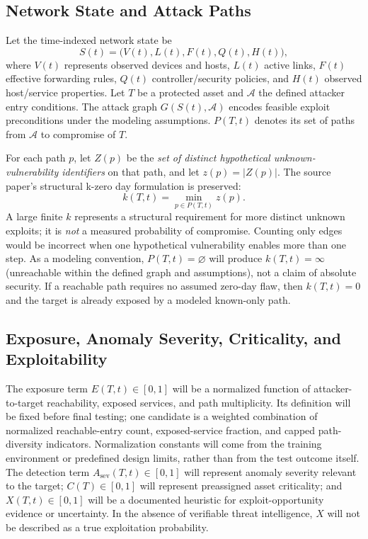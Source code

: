 \documentclass[12pt,a4paper,oneside]{article}
\begin{document}
\subsection{Network State and Attack Paths}
Let the time-indexed network state be
\begin{equation}
S(t)=\bigl(V(t),L(t),F(t),Q(t),H(t)\bigr),\label{eq:state}
\end{equation}
where $V(t)$ represents observed devices and hosts, $L(t)$ active links, $F(t)$ effective forwarding rules, $Q(t)$ controller/security policies, and $H(t)$ observed host/service properties. Let $T$ be a protected asset and $\mathcal{A}$ the defined attacker entry conditions. The attack graph $G(S(t),\mathcal{A})$ encodes feasible exploit preconditions under the modeling assumptions. $P(T,t)$ denotes its set of paths from $\mathcal{A}$ to compromise of $T$.

For each path $p$, let $Z(p)$ be the \emph{set of distinct hypothetical unknown-vulnerability identifiers} on that path, and let $z(p)=|Z(p)|$. The source paper's structural k-zero day formulation is preserved:
\begin{equation}
\boxed{k(T,t)=\min_{p\in P(T,t)}z(p).}\label{eq:k}
\end{equation}
A large finite $k$ represents a structural requirement for more distinct unknown exploits; it is \emph{not} a measured probability of compromise. Counting only edges would be incorrect when one hypothetical vulnerability enables more than one step. As a modeling convention, $P(T,t)=\varnothing$ will produce $k(T,t)=\infty$ (unreachable within the defined graph and assumptions), not a claim of absolute security. If a reachable path requires no assumed zero-day flaw, then $k(T,t)=0$ and the target is already exposed by a modeled known-only path.

\subsection{Exposure, Anomaly Severity, Criticality, and Exploitability}
The exposure term $E(T,t)\in[0,1]$ will be a normalized function of attacker-to-target reachability, exposed services, and path multiplicity. Its definition will be fixed before final testing; one candidate is a weighted combination of normalized reachable-entry count, exposed-service fraction, and capped path-diversity indicators. Normalization constants will come from the training environment or predefined design limits, rather than from the test outcome itself. The detection term $A_{\mathrm{sev}}(T,t)\in[0,1]$ will represent anomaly severity relevant to the target; $C(T)\in[0,1]$ will represent preassigned asset criticality; and $X(T,t)\in[0,1]$ will be a documented heuristic for exploit-opportunity evidence or uncertainty. In the absence of verifiable threat intelligence, $X$ will not be described as a true exploitation probability.
\end{document}
